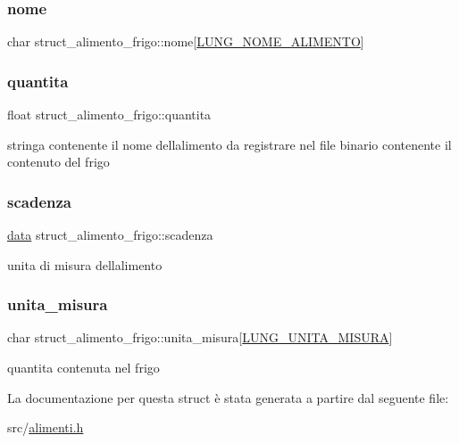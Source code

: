\subsubsection{\texorpdfstring{nome}{nome}}
{\footnotesize\ttfamily char struct\+\_\+alimento\+\_\+frigo\+::nome\mbox{[}\hyperlink{alimenti_8h_af503a16b1a63b47d6a5b2edd94b5caf2}{L\+U\+N\+G\+\_\+\+N\+O\+M\+E\+\_\+\+A\+L\+I\+M\+E\+N\+TO}\mbox{]}}

\mbox{\label{structstruct__alimento__frigo_a9cce03ebdd2af11fb8b950d6b0743dba}} 
\subsubsection{\texorpdfstring{quantita}{quantita}}
{\footnotesize\ttfamily float struct\+\_\+alimento\+\_\+frigo\+::quantita}



stringa contenente il nome dell\textquotesingle{}alimento da registrare nel file binario contenente il contenuto del frigo 

\mbox{\label{structstruct__alimento__frigo_abb5328b46b9c5dfefab9fd0395b5e8f0}} 
\subsubsection{\texorpdfstring{scadenza}{scadenza}}
{\footnotesize\ttfamily \hyperlink{date_8h_a511ae0b1c13f95e5f08f1a0dd3da3d93}{data} struct\+\_\+alimento\+\_\+frigo\+::scadenza}



unita di misura dell\textquotesingle{}alimento 

\mbox{\label{structstruct__alimento__frigo_afbd3224290ae7df2c87de5181ff14c11}} 
\subsubsection{\texorpdfstring{unita\+\_\+misura}{unita\_misura}}
{\footnotesize\ttfamily char struct\+\_\+alimento\+\_\+frigo\+::unita\+\_\+misura\mbox{[}\hyperlink{alimenti_8h_ade0f1f034a3ec6c04b8e29f4730db983}{L\+U\+N\+G\+\_\+\+U\+N\+I\+T\+A\+\_\+\+M\+I\+S\+U\+RA}\mbox{]}}



quantita contenuta nel frigo 



La documentazione per questa struct è stata generata a partire dal seguente file\+:\begin{DoxyCompactItemize}
\item 
src/\hyperlink{alimenti_8h}{alimenti.\+h}\end{DoxyCompactItemize}
